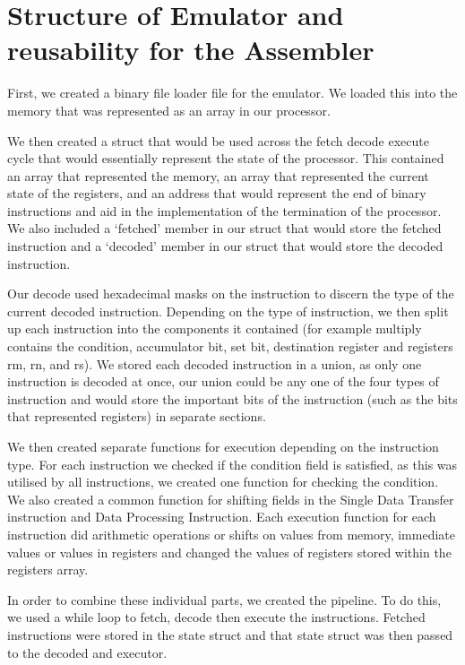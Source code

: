 \documentclass{article}
\begin{document}
\section{Structure of Emulator and reusability for the Assembler }

First, we created a binary file loader file for the emulator. We loaded this into the memory that was represented as an array in our processor.

We then created a struct that would be used across the fetch decode execute cycle that would essentially represent the state of the processor. This contained an array that represented the memory, an array that represented the current state of the registers, and an address that would represent the end of binary instructions and aid in the implementation of the termination of the processor. We also included a ‘fetched’ member in our struct that would store the fetched instruction and a ‘decoded’ member in  our struct that would store the decoded instruction.

Our decode used hexadecimal masks on the instruction to discern the type of the current decoded instruction. Depending on the type of instruction, we then split up each instruction into the components it contained (for example multiply contains the condition, accumulator bit, set bit, destination register and registers rm, rn, and rs). We stored each decoded instruction in a union, as only one instruction is decoded at once, our union could be any one of the four types of instruction and would store the important bits of the instruction (such as the bits that represented registers) in separate sections.

We then created separate functions for execution depending on the instruction type. For each instruction we checked if the condition field is satisfied, as this was utilised by all instructions, we created one function for checking the condition. We also created a common function for shifting fields in the Single Data Transfer instruction and Data Processing Instruction. Each execution function for each instruction did arithmetic operations or shifts on values from memory, immediate values or values in registers and changed the values of registers stored within the registers array.

In order to combine these individual parts, we created the pipeline. To do this, we used a while loop to fetch, decode then execute the instructions. Fetched instructions were stored in the state struct and that state struct was then passed to the decoded and executor.
\end{document}
